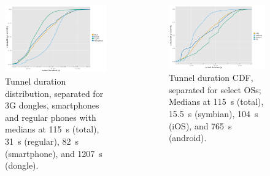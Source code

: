 \documentclass{beamer}
\begin{document}
\begin{frame}
	\begin{columns}[T]
		\begin{figure}
			\includegraphics[width=\columnwidth]{../../chapters/04-mobilenets/images/R-tunnel-duration-device-type.pdf}
			\caption{Tunnel duration distribution, separated for 3G dongles, smartphones and regular phones with medians at \SI{115}{\second} (total), \SI{31}{\second} (regular), \SI{82}{\second} (smartphone), and \SI{1207}{\second} (dongle).}
		\end{figure}

		\begin{figure}
			\includegraphics[width=\columnwidth]{../../chapters/04-mobilenets/images/R-tunnel-duration-operating-system.pdf}
			\caption{Tunnel duration CDF, separated for select OSs; Medians at \SI{115}{\second} (total), \SI{15.5}{\second} (symbian), \SI{104}{\second} (iOS), and \SI{765}{\second} (android).}
		\end{figure}
	\end{columns}
\end{frame}
\end{document}
